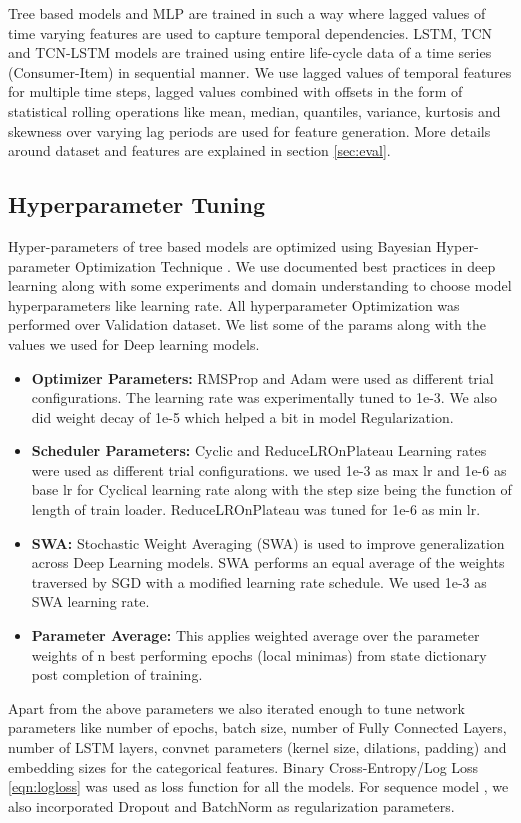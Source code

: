 Tree based models and MLP are trained in such a way where lagged values of time varying features are used
to capture temporal dependencies. LSTM, TCN and TCN-LSTM models are trained using entire life-cycle data of a 
time series (Consumer-Item) in sequential manner.
We use lagged values of temporal features for multiple time steps, lagged values combined with offsets in the form 
of statistical rolling operations like mean, median, quantiles, variance, 
kurtosis and skewness over varying lag periods are used for feature generation. More details around dataset and features 
are explained in section \ref{sec:eval}. 

\subsection{Hyperparameter Tuning}
Hyper-parameters of tree based models are optimized
using Bayesian Hyper-parameter Optimization Technique \cite{bergstra2013hyperopt}. We use documented best practices in deep 
learning along with some experiments and domain understanding to choose model hyperparameters like learning rate.
All hyperparameter Optimization was performed over Validation dataset. 
We list some of the params along with the values we used for Deep learning models.
  \begin{itemize}
    \item {\bf Optimizer Parameters:} RMSProp \cite{bengio2015rmsprop} and Adam were used as different trial configurations. The learning rate 
    was experimentally tuned to 1e-3. We also did weight decay of 1e-5 which helped a bit in model Regularization.
    \item {\bf Scheduler Parameters:} Cyclic \cite{smith2017cyclical} and ReduceLROnPlateau \cite{zaheer2018adaptive} 
    Learning rates were used as different trial configurations.
    we used 1e-3 as max lr and 1e-6 as base lr for Cyclical learning rate along with the step size being the function of
    length of train loader. ReduceLROnPlateau was tuned for 1e-6 as min lr.
    \item {\bf SWA:} Stochastic Weight Averaging (SWA) \cite{izmailov2018averaging} is used to improve generalization across Deep Learning
    models. SWA performs an equal average of the weights traversed by SGD with a modified learning rate schedule. We used 
    1e-3 as SWA learning rate.
    \item {\bf Parameter Average:} This applies weighted average over the parameter weights of n best performing epochs 
    (local minimas) from state dictionary post completion of training.
  \end{itemize}
Apart from the above parameters we also iterated enough to tune network parameters like number of epochs, batch size, 
number of Fully Connected Layers, number of LSTM layers, convnet parameters (kernel size, dilations, padding)
and embedding sizes for the categorical features. Binary Cross-Entropy/Log Loss \ref{eqn:logloss} was used as loss 
function for all the models. For sequence model \cite{sutskever2014sequence}, we also incorporated 
Dropout \cite{hinton2012improving} and BatchNorm \cite{santurkar2018does} as regularization parameters.

